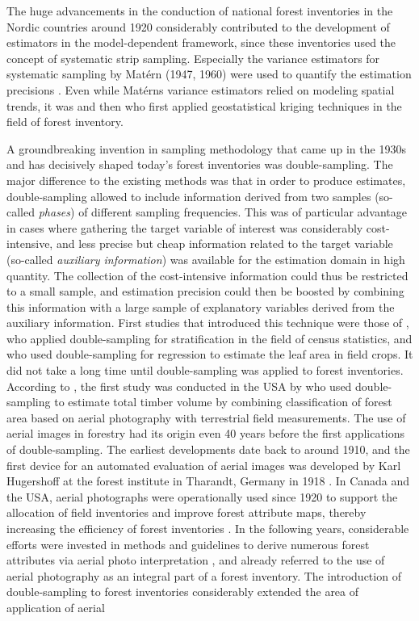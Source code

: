 The huge advancements in the conduction of national forest inventories in the Nordic countries around 1920 considerably contributed to the development of estimators in the model-dependent framework, since these inventories used the concept of systematic strip sampling. Especially the variance estimators for systematic sampling by Mat\'{e}rn (1947, 1960) were used to quantify the estimation precisions \citep{kangas2006}. Even while Mat\'{e}rns variance estimators relied on modeling spatial trends, it was \citet{houllier1987} and then \citet{mandallaz1993} who first applied geostatistical kriging techniques in the field of forest inventory.\par

A groundbreaking invention in sampling methodology that came up in the 1930s and has decisively shaped today's forest inventories was double-sampling. The major difference to the existing methods was that in order to produce estimates, double-sampling allowed to include information derived from two samples (so-called \textit{phases}) of different sampling frequencies. This was of particular advantage in cases where gathering the target variable of interest was considerably cost-intensive, and less precise but cheap information related to the target variable (so-called \textit{auxiliary information}) was available for the estimation domain in high quantity. The collection of the cost-intensive information could thus be restricted to a small sample, and estimation precision could then be boosted by combining this information with a large sample of explanatory variables derived from the auxiliary information. First studies that introduced this technique were those of \citet{neyman1938}, who applied double-sampling for stratification in the field of census statistics, and \citet{watson1937} who used double-sampling for regression to estimate the leaf area in field crops. It did not take a long time until double-sampling was applied to forest inventories. According to \citet{kangas2006}, the first study was conducted in the USA by \citet{bickford1952, bickford1953} who used double-sampling to estimate total timber volume by combining classification of forest area based on aerial photography with terrestrial field measurements. The use of aerial images in forestry had its origin even 40 years before the first applications of double-sampling. The earliest developments date back to around 1910, and the first device for an automated evaluation of aerial images was developed by Karl Hugershoff at the forest institute in Tharandt, Germany in 1918 \citep{prager1961}. In Canada and the USA, aerial photographs were operationally used since 1920 to support the allocation of field inventories and improve forest attribute maps, thereby increasing the efficiency of forest inventories \citep{langballe1938}. In the following years, considerable efforts were invested in methods and guidelines to derive numerous forest attributes via aerial photo interpretation \citep[e.g.,][]{hildebrandt1996}, and \citet{zoehrer1980} already referred to the use of aerial photography as an integral part of a forest inventory. The introduction of double-sampling to forest inventories considerably extended the area of application of aerial 